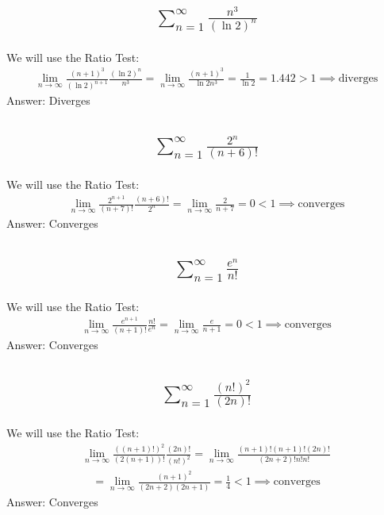 \documentclass{article}
\begin{document}
\subsection{
	\begin{align*}
		\sum_{n = 1}^\infty \frac{n^3}{\left( \ln{2} \right)^n}
	\end{align*}
}
We will use the Ratio Test:
\begin{align*}
	\lim_{n \to \infty} \frac{(n + 1)^3}{(\ln{2})^{n + 1}} \frac{(\ln{2})^n}{n^3} = \lim_{n \to \infty} \frac{(n + 1)^3}{\ln{2} n^3} = \frac{1}{\ln{2}} = 1.442 > 1 \implies \text{diverges}
\end{align*}
Answer: Diverges

\subsection{
	\begin{align*}
		\sum_{n = 1}^\infty \frac{2^n}{(n + 6)!}
	\end{align*}
}
We will use the Ratio Test:
\begin{align*}
	\lim_{n \to \infty} \frac{2^{n + 1}}{(n + 7)!} \frac{(n + 6)!}{2^n} = \lim_{n \to \infty} \frac{2}{n + 7} = 0 < 1 \implies \text{converges}
\end{align*}
Answer: Converges

\subsection{
	\begin{align*}
		\sum_{n = 1}^\infty \frac{e^n}{n!}
	\end{align*}
}
We will use the Ratio Test:
\begin{align*}
	\lim_{n \to \infty} \frac{e^{n + 1}}{(n + 1)!} \frac{n!}{e^n} = \lim_{n \to \infty} \frac{e}{n + 1} = 0 < 1 \implies \text{converges}
\end{align*}
Answer: Converges

\subsection{
	\begin{align*}
		\sum_{n = 1}^\infty \frac{(n!)^2}{(2n)!}
	\end{align*}
}
We will use the Ratio Test:
\begin{align*}
	\lim_{n \to \infty} \frac{((n + 1)!)^2}{(2(n + 1))!} \frac{(2n)!}{(n!)^2} = \lim_{n \to \infty} \frac{(n + 1)! (n + 1)! (2n)!}{(2n + 2)! n! n!}
\end{align*}
\begin{align*}
	= \lim_{n \to \infty} \frac{(n + 1)^2}{(2n + 2)(2n + 1)} = \frac{1}{4} < 1 \implies \text{converges}
\end{align*}
Answer: Converges
\end{document}

